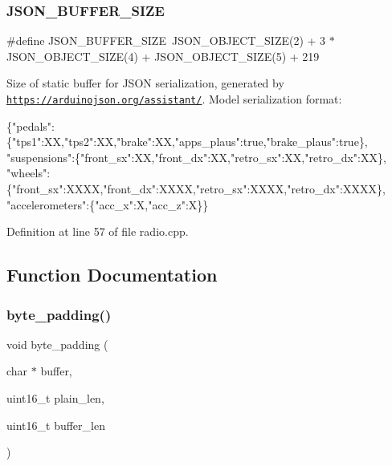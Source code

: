 \subsubsection{\texorpdfstring{J\+S\+O\+N\+\_\+\+B\+U\+F\+F\+E\+R\+\_\+\+S\+I\+ZE}{JSON\_BUFFER\_SIZE}}
{\footnotesize\ttfamily \#define J\+S\+O\+N\+\_\+\+B\+U\+F\+F\+E\+R\+\_\+\+S\+I\+ZE~J\+S\+O\+N\+\_\+\+O\+B\+J\+E\+C\+T\+\_\+\+S\+I\+ZE(2) + 3 $\ast$ J\+S\+O\+N\+\_\+\+O\+B\+J\+E\+C\+T\+\_\+\+S\+I\+ZE(4) + J\+S\+O\+N\+\_\+\+O\+B\+J\+E\+C\+T\+\_\+\+S\+I\+ZE(5) + 219}



Size of static buffer for J\+S\+ON serialization, generated by \href{https://arduinojson.org/assistant/}{\tt https\+://arduinojson.\+org/assistant/}. Model serialization format\+: 


\begin{DoxyCode}
\{\textcolor{stringliteral}{"pedals"}:\{\textcolor{stringliteral}{"tps1"}:XX,\textcolor{stringliteral}{"tps2"}:XX,\textcolor{stringliteral}{"brake"}:XX,\textcolor{stringliteral}{"apps\_plaus"}:\textcolor{keyword}{true},\textcolor{stringliteral}{"brake\_plaus"}:\textcolor{keyword}{true}\},
 \textcolor{stringliteral}{"suspensions"}:\{\textcolor{stringliteral}{"front\_sx"}:XX,\textcolor{stringliteral}{"front\_dx"}:XX,\textcolor{stringliteral}{"retro\_sx"}:XX,\textcolor{stringliteral}{"retro\_dx"}:XX\},
 \textcolor{stringliteral}{"wheels"}:\{\textcolor{stringliteral}{"front\_sx"}:XXXX,\textcolor{stringliteral}{"front\_dx"}:XXXX,\textcolor{stringliteral}{"retro\_sx"}:XXXX,\textcolor{stringliteral}{"retro\_dx"}:XXXX\},
 \textcolor{stringliteral}{"accelerometers"}:\{\textcolor{stringliteral}{"acc\_x"}:X,\textcolor{stringliteral}{"acc\_z"}:X\}\}
\end{DoxyCode}
 

Definition at line 57 of file radio.\+cpp.



\subsection{Function Documentation}
\mbox{\label{group___radio__module_ga2cca2e5e5a5f34888f1801e752c29eb3}} 
\subsubsection{\texorpdfstring{byte\+\_\+padding()}{byte\_padding()}}
{\footnotesize\ttfamily void byte\+\_\+padding (\begin{DoxyParamCaption}\item[{char $\ast$}]{buffer,  }\item[{uint16\+\_\+t}]{plain\+\_\+len,  }\item[{uint16\+\_\+t}]{buffer\+\_\+len }\end{DoxyParamCaption})}



